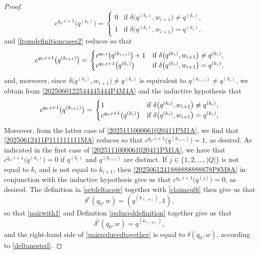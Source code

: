 \documentclass[12pt]{article}
\begin{document}
\begin{proof}
\begin{equation}
 c^{q_0, i+1}\big( q^{(k_{i})} \big) = 
 \begin{cases} 
 0 & \text{if $\delta\big( q^{(k_i)}, w_{i+1} \big) \neq q^{(k_i)} $}, \\ 
 1 
 & \text{if $\delta\big( q^{(k_i)}, w_{i+1} \big) = q^{(k_i)} $}, 
 \end{cases} 
\end{equation}
 and \eqref{fromdefinitioncases2} reduces so that 
\begin{equation}\label{2025060122544445444P4M4A}
 c^{q_0, i+1}\big( q^{(k_{i+1})} \big) = \\ 
 \begin{cases} 
 c^{q_0, i}\big( q^{(k_{i+1})} \big) + 1 
 & \text{if $\delta\big( q^{(k_i)}, w_{i+1} \big) \neq q^{(k_i)} $}, \\ 
 c^{q_0, i+1}\big( q^{(k_i)} \big) & \text{if $\delta\big( q^{(k_i)}, w_{i+1} \big) = q^{(k_i)} $}, 
 \end{cases} 
\end{equation}
 and, moreover, since $\delta\big( q^{(k_i)}, w_{i+1} \big) \neq q^{(k_i)}$
 is equivalent to $q^{(k_{i+1})} \neq q^{(k_i)}$, we obtain from 
 \eqref{2025060122544445444P4M4A} and the inductive hypothesis that 
\begin{equation}\label{20250612411P111111111MA}
 c^{q_0, i+1}\big( q^{(k_{i+1})} \big) = \\ 
 \begin{cases} 
 1 
 & \text{if $\delta\big( q^{(k_i)}, w_{i+1} \big) \neq q^{(k_i)} $}, \\ 
 c^{q_0, i+1}\big( q^{(k_i)} \big) & \text{if $\delta\big( q^{(k_i)}, w_{i+1} \big) = q^{(k_i)} $}, 
 \end{cases} 
\end{equation}
 Moreover, from the latter case of \eqref{2025111000061020411PM1A}, 
 we find that \eqref{20250612411P111111111MA} reduces so that 
 $ c^{q_0, i+1}\big( q^{(k_{i+1})} \big) = 1$, 
 as desired. As indicated in the first case of \eqref{2025111000061020411PM1A}, we have that 
 $ c^{q_0, i+1}\big( q^{(k_{i})} \big) = 0 $ 
 if $q^{(k_i)}$ and $q^{(k_{i+1})}$ are distinct. 
 If $j \in \{ 1, 2, \ldots, |Q| \}$ is not equal to $k_i$ and is not equal to $k_{i+1}$, 
 then \eqref{2025061241888888888878P8M8A} in conjunction with the inductive hypothesis 
 give us that 
 $ c^{q_0, i+1}\big( q^{(j)} \big) = 0$, 
 as desired. The definition in \eqref{setdeltacqw} 
 together with \eqref{claimcq0i} then give us that 
\begin{equation}\label{pairwith1}
 \delta^{c}( q_0, w ) 
 = \left( q^{( k_{\ell(w)} )}, 
 1 \right), 
\end{equation}
 so that \eqref{pairwith1} and Definition \ref{reduceddefinition} together give us that 
\begin{equation}\label{pairreducedtogether}
 \overline{\delta^{c}}( q_0, w ) 
 = q^{( k_{\ell(w)} )}, 
\end{equation}
 and the right-hand side of \eqref{pairreducedtogether} is equal to 
 $\delta(q_0, w)$, according to \eqref{deltanested}. 
\end{proof}
\end{document}
